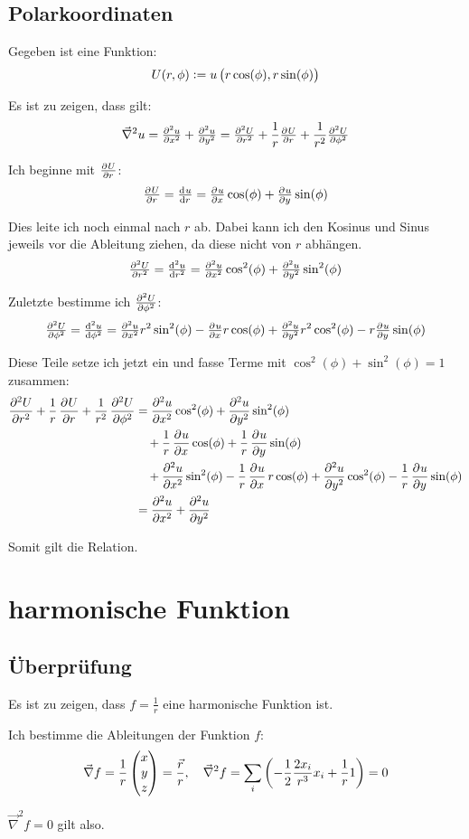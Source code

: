\documentclass[11pt, ngerman]{article}
\newcommand{\laplace}{\vnabla^2}
\newcommand{\vnabla}{\vec \nabla}
\begin{document}
\subsection{Polarkoordinaten}

Gegeben ist eine Funktion:
\[
	U(r, \phi) := u\del{r \cos(\phi), r \sin(\phi)}
\]

Es ist zu zeigen, dass gilt:
\[
	\laplace u = \pd[2] ux + \pd[2] uy = \pd[2] Ur + \frac 1r \pd Ur + \frac
	1{r^2} \pd[2] U\phi
\]

Ich beginne mit $\pd U r$:
\[
	\pd Ur = \od ur = \pd ux \cos(\phi) + \pd uy \sin(\phi)
\]

Dies leite ich noch einmal nach $r$ ab. Dabei kann ich den Kosinus und Sinus
jeweils vor die Ableitung ziehen, da diese nicht von $r$ abhängen.
\[
	\pd[2] Ur = \od[2] ur = \pd[2] ux \cos^2(\phi) + \pd[2] uy \sin^2(\phi)
\]

Zuletzte bestimme ich $\pd[2] U\phi$:
\[
	\pd[2] U\phi = \od[2] u\phi = \pd[2] ux r^2 \sin^2(\phi) - \pd ux r
	\cos(\phi) + \pd[2] uy r^2 \cos^2(\phi) - r \pd uy \sin(\phi)
\]

Diese Teile setze ich jetzt ein und fasse Terme mit $\cos^2(\phi) +
\sin^2(\phi) = 1$ zusammen:
%
\begin{align*}
	\dpd[2] Ur + \frac 1r \dpd Ur + \frac 1{r^2} \dpd[2] U\phi
	&=\dpd[2] ux \cos^2(\phi) + \dpd[2] uy \sin^2(\phi) \\
	&\quad+ \frac 1r \dpd ux \cos(\phi) + \frac 1r \dpd uy \sin(\phi) \\
	&\quad+ \dpd[2] ux \sin^2(\phi) - \frac 1r \dpd ux r \cos(\phi) + \dpd[2]
	uy \cos^2(\phi) - \frac 1r \dpd uy \sin(\phi) \\
	&= \dpd[2] ux + \dpd[2] uy
\end{align*}

Somit gilt die Relation.

\section{harmonische Funktion}

\subsection{Überprüfung}

Es ist zu zeigen, dass $f = \frac 1r$ eine harmonische Funktion ist.

Ich bestimme die Ableitungen der Funktion $f$:
\[
	\vnabla f = \frac{1}{r} \begin{pmatrix}
		x \\ y \\ z
	\end{pmatrix} = \frac{\vec r}{r}
	,\quad
	\laplace f = \sum_i \del{- \frac12 \frac{2x_i}{r^3} x_i + \frac 1r 1} = 0
\]

$\laplace f = 0$ gilt also.



\end{document}
